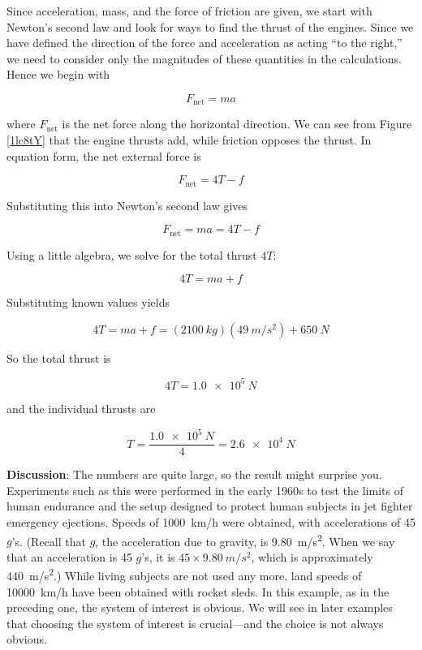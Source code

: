 \documentclass[../../main-ap-physics.tex]{subfiles}
\begin{document}
Since acceleration, mass, and the force of friction are given, we start with Newton's second law and look for ways to find the thrust of the engines. Since we have defined the direction of the force and acceleration as acting ``to the right,'' we need to consider only the magnitudes of these quantities in the calculations. Hence we begin with

\begin{equation*}
    F_{\text{net}} = m a
\end{equation*}

where $F_{\text{net}}$ is the net force along the horizontal direction. We can see from Figure \ref{1lc8tY} that the engine thrusts add, while friction opposes the thrust. In equation form, the net external force is

\begin{equation*}
    F_{\text{net}} = 4T - f
\end{equation*}

Substituting this into Newton's second law gives

\begin{equation*}
    F_{\text{net}} = ma = 4T - f
\end{equation*}

Using a little algebra, we solve for the total thrust $4T$:

\begin{equation*}
    4T = ma + f
\end{equation*}

Substituting known values yields

\begin{equation*}
    4 T = ma + f = \left(\SI{2100}{kg}\right) \left(\SI{49}{m/s^2}\right) + \SI{650}{N}
\end{equation*}

So the total thrust is

\begin{equation*}
    4T = \SI{1.0e5}{N}
\end{equation*}

and the individual thrusts are

\begin{equation*}
    T = \frac{\SI{1.0e5}{N}}{4} = \SI{2.6e4}{N}
\end{equation*}

\textbf{Discussion}: The numbers are quite large, so the result might surprise you. Experiments such as this were performed in the early 1960s to test the limits of human endurance and the setup designed to protect human subjects in jet fighter emergency ejections. Speeds of \SI{1000}{km/h} were obtained, with accelerations of 45 $g$'s. (Recall that $g$, the acceleration due to gravity, is \SI{9.80}{m/s^2}. When we say that an acceleration is 45 $g$'s, it is  $45 \times \SI{9.80}{m/s^2}$, which is approximately  \SI{440}{m/s^2}.) While living subjects are not used any more, land speeds of \SI{10000}{km/h} have been obtained with rocket sleds. In this example, as in the preceding one, the system of interest is obvious. We will see in later examples that choosing the system of interest is crucial---and the choice is not always obvious.
\end{document}
